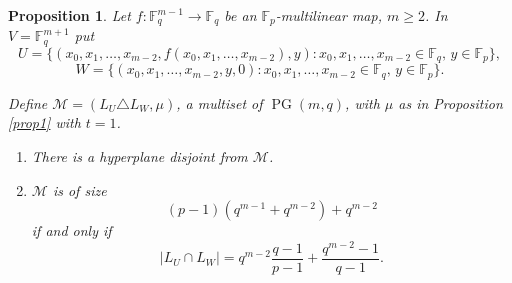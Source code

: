 \documentclass[12pt]{article}
\newcommand{\cM}{{\mathcal M}}
\newcommand{\F}{{\mathbb F}}
\newtheorem{proposition}[theorem]{Proposition}
\DeclareMathOperator{\PG}{{PG}}
\begin{document}
\begin{proposition}
	\label{prop2}
	Let $f\colon \F_q^{m-1}\rightarrow \F_q$ be an $\F_p$-multilinear map, $m \geq 2$. In $V= \F_q^{m+1}$ put
	\begin{equation} \label{U}
		U=\{ (x_0,x_1,\ldots,x_{m-2},f(x_0,x_1,\ldots,x_{m-2}),y) \colon x_0,x_1,\ldots,x_{m-2} \in \F_q,\, y\in \F_p \},
	\end{equation}
	\begin{equation}\label{W} 
		W=\{(x_0,x_1,\ldots,x_{m-2},y,0)\colon x_0,x_1,\ldots,x_{m-2}\in \F_q, \, y\in \F_p\}.     
	\end{equation}
	
	Define $\cM=(L_U \triangle L_W,\mu)$, a multiset of $\PG(m,q)$, with $\mu$ as in Proposition \ref{prop1} with $t=1$.
	\begin{enumerate}[\rm(1)]
		\item There is a hyperplane disjoint from $\cM$.
		\item $\cM$ is of size
		\[(p-1)(q^{m-1}+q^{m-2})+q^{m-2}\]
		if and only if 
		\[|L_U \cap L_W|=q^{m-2}\frac{q-1}{p-1}+\frac{q^{m-2}-1}{q-1}. \]
		
	\end{enumerate}
\end{proposition}
\end{document}
